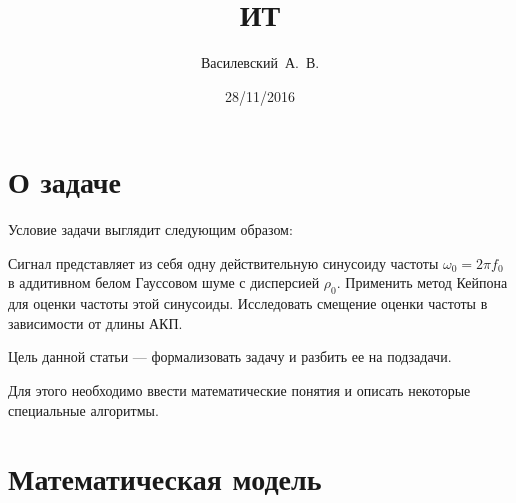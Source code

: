 




\title{ИТ}
\def\subtitle{Исследование смещения оценки частоты методом Кейпона от длины АКП}
\def\edition{[28112016]\ \#\ 1}

\author{Василевский~А.~В.}
\date{28/11/2016}









	

    \setcounter{chapter}{1}



    \section{О задаче}

    Условие задачи выглядит следующим образом:

    \begin{problem}
        Сигнал представляет из себя одну действительную синусоиду частоты $\omega_0=2\pi f_0$ в аддитивном белом Гауссовом шуме с дисперсией $\rho_0$. Применить метод Кейпона для оценки частоты этой синусоиды. Исследовать смещение оценки частоты в зависимости от длины АКП.
    \end{problem}

    Цель данной статьи --- формализовать задачу и разбить ее на подзадачи.

    Для этого необходимо ввести математические понятия и описать некоторые специальные алгоритмы.



    \section{Математическая модель}

